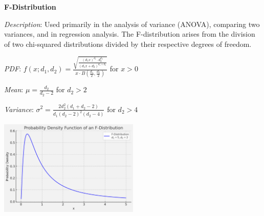\documentclass{article}
\begin{document}
\begin{mdframed}
  \textbf{F-Distribution}
  
  \textit{Description}: Used primarily in the analysis of variance (ANOVA), comparing two variances, and in regression analysis. The F-distribution arises from the division of two chi-squared distributions divided by their respective degrees of freedom.
  \begin{multicols}{2}
    \textit{PDF}: $f(x; d_1, d_2) = \frac{\sqrt{\frac{(d_1 x)^{d_1} \cdot d_2^{d_2}}{(d_1 x + d_2)^{d_1 + d_2}}}}{x \cdot B\left(\frac{d_1}{2}, \frac{d_2}{2}\right)}$ for $x > 0$
  
  \textit{Mean}: $\mu = \frac{d_2}{d_2 - 2}$ for $d_2 > 2$
  
  \textit{Variance}: $\sigma^2 = \frac{2d_2^2(d_1 + d_2 - 2)}{d_1(d_2 - 2)^2(d_2 - 4)}$ for $d_2 > 4$
  \begin{center}
    \includegraphics*[width=0.5\textwidth]{fdistribution.png}
  \end{center}
          
  \end{multicols}
  
  
\end{mdframed}
\end{document}
